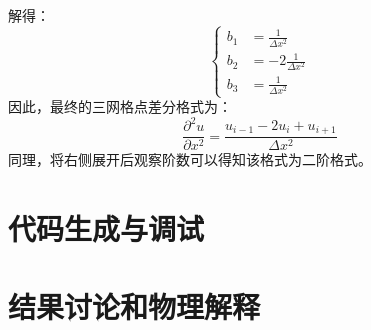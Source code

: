 \documentclass[UTF8]{ctexart}
\begin{document}
解得：
\begin{equation}
    \begin{cases}
        b_1 &=  \frac{1}{\Delta x^2}\\
        b_2 &=  -2\frac{1}{\Delta x^2}\\
        b_3 &=  \frac{1}{\Delta x^2}
    \end{cases}
\end{equation}
因此，最终的三网格点差分格式为：
\begin{equation}
    \frac{\partial^2 u}{\partial x^2} = \frac{u_{i-1} - 2u_i + u_{i+1}}{\Delta x^2}
\end{equation}
同理，将右侧展开后观察阶数可以得知该格式为二阶格式。


\section{代码生成与调试}


\section{结果讨论和物理解释}
\end{document}
